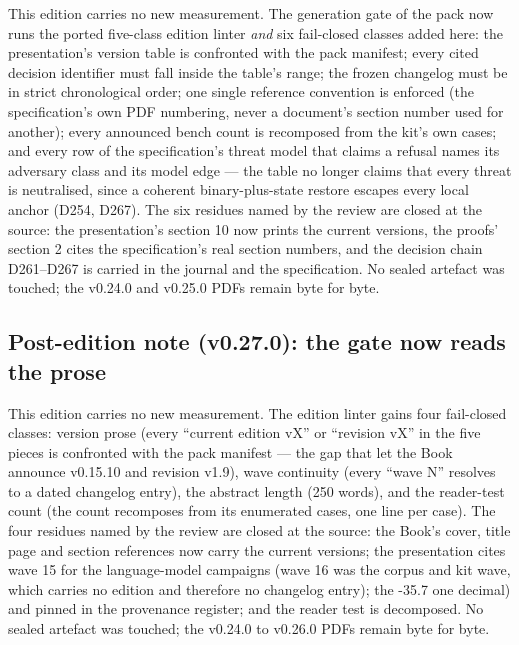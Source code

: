 \documentclass[10pt,a4paper]{article}
\begin{document}
This edition carries no new measurement. The generation gate of the pack now runs the
ported five-class edition linter \emph{and} six fail-closed classes added here: the
presentation's version table is confronted with the pack manifest; every cited decision
identifier must fall inside the table's range; the frozen changelog must be in strict
chronological order; one single reference convention is enforced (the specification's own
PDF numbering, never a document's section number used for another); every announced bench
count is recomposed from the kit's own cases; and every row of the specification's
threat model that claims a refusal names its adversary class and its model edge --- the
table no longer claims that every threat is neutralised, since a coherent binary-plus-state
restore escapes every local anchor (D254, D267). The six residues named by the review are
closed at the source: the presentation's section 10 now prints the current versions, the
proofs' section 2 cites the specification's real section numbers, and the decision chain
D261--D267 is carried in the journal and the specification. No sealed artefact was touched;
the v0.24.0 and v0.25.0 PDFs remain byte for byte.


\subsection{Post-edition note (v0.27.0): the gate now reads the prose}

This edition carries no new measurement. The edition linter gains four fail-closed classes:
version prose (every ``current edition vX'' or ``revision vX'' in the five pieces is
confronted with the pack manifest --- the gap that let the Book announce v0.15.10 and
revision v1.9), wave continuity (every ``wave N'' resolves to a dated changelog entry), the
abstract length (250 words), and the reader-test count (the count recomposes from its
enumerated cases, one line per case). The four residues named by the review are closed at
the source: the Book's cover, title page and section references now carry the current
versions; the presentation cites wave 15 for the language-model campaigns (wave 16 was the
corpus and kit wave, which carries no edition and therefore no changelog entry); the
-35.7%
one decimal) and pinned in the provenance register; and the reader test is decomposed. No
sealed artefact was touched; the v0.24.0 to v0.26.0 PDFs remain byte for byte.
\end{document}
